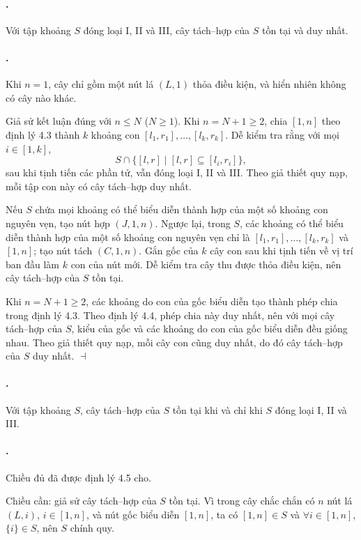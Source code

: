 \documentclass[11pt]{article}
\providecommand{\square}{\dashv}
\begin{document}
\paragraph{.}
Với tập khoảng $S$ đóng loại I, II và III, cây tách--hợp của $S$ tồn tại và
duy nhất.

\paragraph{.}
Khi $n=1$, cây chỉ gồm một nút lá $(L,1)$ thỏa điều kiện, và hiển nhiên không
có cây nào khác.

Giả sử kết luận đúng với $n\le N$ ($N\ge1$). Khi $n=N+1\ge2$, chia $[1,n]$
theo định lý 4.3 thành $k$ khoảng con
$[l_1,r_1],\ldots,[l_k,r_k]$. Dễ kiểm tra rằng với mọi $i\in[1,k]$,
\[
  S\cap\{[l,r]\mid [l,r]\subseteq[l_i,r_i]\},
\]
sau khi tịnh tiến các phần tử, vẫn đóng loại I, II và III. Theo giả thiết quy
nạp, mỗi tập con này có cây tách--hợp duy nhất.

Nếu $S$ chứa mọi khoảng có thể biểu diễn thành hợp của một số khoảng con
nguyên vẹn, tạo nút hợp $(J,1,n)$. Ngược lại, trong $S$, các khoảng có thể
biểu diễn thành hợp của một số khoảng con nguyên vẹn chỉ là
$[l_1,r_1],\ldots,[l_k,r_k]$ và $[1,n]$; tạo nút tách $(C,1,n)$. Gắn gốc của
$k$ cây con sau khi tịnh tiến về vị trí ban đầu làm $k$ con của nút mới. Dễ
kiểm tra cây thu được thỏa điều kiện, nên cây tách--hợp của $S$ tồn tại.

Khi $n=N+1\ge2$, các khoảng do con của gốc biểu diễn tạo thành phép chia trong
định lý 4.3. Theo định lý 4.4, phép chia này duy nhất, nên với mọi cây
tách--hợp của $S$, kiểu của gốc và các khoảng do con của gốc biểu diễn đều
giống nhau. Theo giả thiết quy nạp, mỗi cây con cũng duy nhất, do đó cây
tách--hợp của $S$ duy nhất. \hfill$\square$

\paragraph{.}
Với tập khoảng $S$, cây tách--hợp của $S$ tồn tại khi và chỉ khi $S$ đóng loại
I, II và III.

\paragraph{.}
Chiều đủ đã được định lý 4.5 cho.

Chiều cần: giả sử cây tách--hợp của $S$ tồn tại. Vì trong cây chắc chắn có
$n$ nút lá $(L,i)$, $i\in[1,n]$, và nút gốc biểu diễn $[1,n]$, ta có
$[1,n]\in S$ và $\forall i\in[1,n]$, $\{i\}\in S$, nên $S$ chính quy.
\end{document}
